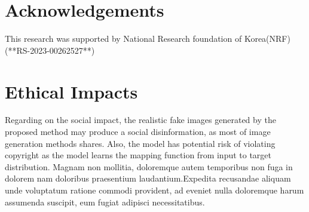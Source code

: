 \documentclass[letterpaper]{article} %
\begin{document}
\section{Acknowledgements}
This research was supported by National Research foundation of Korea(NRF) (**RS-2023-00262527**)

\section{Ethical Impacts}
Regarding on the social impact, the realistic fake images generated by the proposed method may produce a social disinformation, as most of image generation methods shares. Also, the model has potential risk of violating copyright as the model learns the mapping function from input to target distribution.  Magnam non mollitia, doloremque autem temporibus non fuga in dolorem nam doloribus praesentium laudantium.Expedita recusandae aliquam unde voluptatum ratione commodi provident, ad eveniet nulla doloremque harum assumenda suscipit, eum fugiat adipisci necessitatibus.\clearpage

\end{document}
